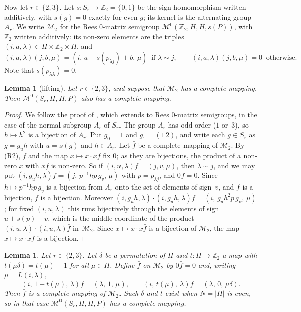 \documentclass[11pt]{article}
\newtheorem{lemma}[theorem]{Lemma}
\theoremstyle{remark}
\newcommand{\M}{\mathcal M}
\newcommand{\Z}{\mathbb Z}
\newcommand{\Mt}{\M_2}
\begin{document}
Now let $r\in\{2,3\}$. Let $s\colon S_r\to\Z_2=\{0,1\}$ be the sign
homomorphism written additively, with $s(g)=0$ exactly for even $g$; its kernel
is the alternating group $A_r$. We write $\Mt$ for the Rees $0$-matrix
semigroup $\M^0(\Z_2,H,H,s(P))$, with $\Z_2$ written additively: its non-zero
elements are the triples $(i,a,\lambda)\in H\times\Z_2\times H$, and
\[
 (i,a,\lambda)(j,b,\mu)=(i,\,a+s(p_{\lambda j})+b,\,\mu)\ \text{ if
 }\lambda\sim j,\qquad (i,a,\lambda)(j,b,\mu)=0\ \text{ otherwise.}
\]
Note that $s(p_{\lambda\lambda})=0$.

\begin{lemma}[lifting]\label{lem:lift}
Let $r\in\{2,3\}$, and suppose that $\Mt$ has a complete mapping. Then
$\M^0(S_r,H,H,P)$ also has a complete mapping.
\end{lemma}

\begin{proof}
We follow the proof of \cite[Theorem~5.2]{abchk}, which
\cite[Lemma~6.3]{abchk} extends to Rees $0$-matrix semigroups, in the case of
the normal subgroup $A_r$ of $S_r$. The group $A_r$ has odd order ($1$
or~$3$), so $h\mapsto h^2$ is a bijection of $A_r$. Put $g_0=1$ and
$g_1=(1\,2)$, and write each $g\in S_r$ as $g=g_uh$ with $u=s(g)$ and $h\in
A_r$. Let $\bar f$ be a complete mapping of $\Mt$. By (R2), $\bar f$ and the
map $x\mapsto x\cdot x\bar f$ fix $0$; as they are bijections, the product of
a non-zero $x$ with $x\bar f$ is non-zero. So if $(i,u,\lambda)\bar
f=(j,v,\mu)$, then $\lambda\sim j$, and we may put
$(i,g_uh,\lambda)f=(j,\,p^{-1}hp\,g_v,\,\mu)$ with $p=p_{\lambda j}$, and
$0f=0$. Since $h\mapsto p^{-1}hp\,g_v$ is a bijection from $A_r$ onto the set
of elements of sign~$v$, and $\bar f$ is a bijection, $f$ is a bijection.
Moreover $(i,g_uh,\lambda)\cdot(i,g_uh,\lambda)f=(i,\,g_uh^2p\,g_v,\,\mu)$; for
fixed $(i,u,\lambda)$ this runs bijectively through the elements of sign
$u+s(p)+v$, which is the middle coordinate of the product
$(i,u,\lambda)\cdot(i,u,\lambda)\bar f$ in~$\Mt$. Since $x\mapsto x\cdot
x\bar f$ is a bijection of $\Mt$, the map $x\mapsto x\cdot xf$ is a bijection.
\end{proof}

\begin{lemma}\label{lem:B}
Let $r\in\{2,3\}$. Let $\delta$ be a permutation of $H$ and $t\colon H\to\Z_2$
a map with $t(\mu\delta)=t(\mu)+1$ for all $\mu\in H$. Define $\bar f$ on $\Mt$
by $0\bar f=0$ and, writing $\mu=L(i,\lambda)$,
\[
 (i,\,1+t(\mu),\,\lambda)\bar f=(\lambda,\,1,\,\mu),\qquad
 (i,\,t(\mu),\,\lambda)\bar f=(\lambda,\,0,\,\mu\delta).
\]
Then $\bar f$ is a complete mapping of $\Mt$. Such $\delta$ and $t$ exist when
$N=|H|$ is even, so in that case $\M^0(S_r,H,H,P)$ has a complete mapping.
\end{lemma}
\end{document}
